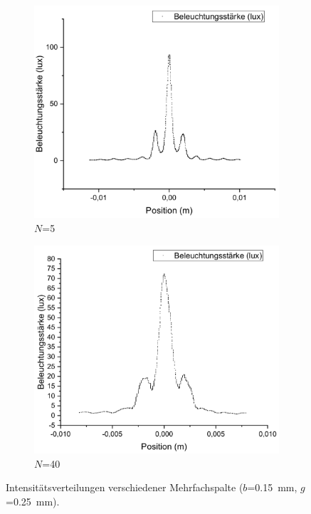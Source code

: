 \documentclass[
	a4paper,
	12pt,
	pagesize,
	ngerman
]{scrartcl}
\begin{document}
\begin{figure}[H]
		\begin{subfigure}{.5\textwidth}
			\centering
			\includegraphics[width=1\linewidth]{GitterN5ZOOM}
			\caption{$N$=5}	
		\end{subfigure}%
		\begin{subfigure}{.5\textwidth}
			\centering
			\includegraphics[width=1\linewidth]{GitterN40ZOOM}
			\caption{$N$=40}
		\end{subfigure}
		\caption{Intensitätsverteilungen verschiedener Mehrfachspalte  ($b$=\SI{0,15}{mm}, $g$=\SI{0,25}{mm}).}
		\label{GitterGraphen}
	\end{figure}
\end{document}
